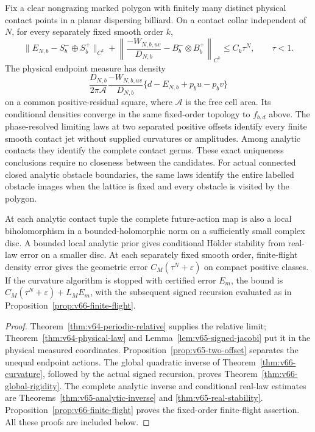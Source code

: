 \begin{theorem}
\label{thm:v66-main}
Fix a clear nongrazing marked polygon with finitely many distinct physical
contact points in a planar dispersing billiard.  On a contact collar
independent of $N$, for every separately fixed smooth order $k$,
\begin{equation}\label{eq:v67-principal-relative}
 \|E_{N,b}-S_b^-\oplus S_b^+\|_{C^k}
 +\left\|\frac{-W_{N,b,uv}}{D_{N,b}}
                       -B_b^-\otimes B_b^+\right\|_{C^k}
                                      \le C_k\tau^N,\qquad \tau<1.
\end{equation}
The physical endpoint measure has density
\[
 \frac{D_{N,b}}{2\pi\mathcal A}
       \frac{-W_{N,b,uv}}{D_{N,b}}
       \{d-E_{N,b}+p_bu-p_bv\}
\]
on a common positive-residual square, where $\mathcal A$ is the free
cell area.  Its conditional densities converge in the same fixed-order
topology to $f_{b,d}$ above.  The phase-resolved limiting laws at two separated positive offsets identify every finite
smooth contact jet without supplied curvatures or amplitudes.  Among
analytic contacts they identify the complete contact germs.  These exact
uniqueness conclusions require no closeness between the candidates.
For actual connected closed analytic obstacle boundaries, the same laws
identify the entire labelled obstacle images when the lattice is fixed
and every obstacle is visited by the polygon.

At each analytic contact tuple the complete future-action map is also a
local biholomorphism in a bounded-holomorphic norm on a sufficiently small
complex disc.  A bounded local analytic prior gives conditional H\"older
stability from real-law error on a smaller disc.  At each separately fixed
smooth order, finite-flight density error gives the geometric error
$C_M(\tau^N+\varepsilon)$ on compact positive classes.  If the
curvature algorithm is stopped with certified error $E_m$, the bound
is $C_M(\tau^N+\varepsilon)+L_ME_m$, with the subsequent signed
recursion evaluated as in Proposition~\ref{prop:v66-finite-flight}.
\end{theorem}
\begin{proof}
Theorem~\ref{thm:v64-periodic-relative} supplies the relative limit;
Theorem~\ref{thm:v64-physical-law} and
Lemma~\ref{lem:v65-signed-jacobi} put it in the physical measured
coordinates.  Proposition~\ref{prop:v65-two-offset} separates the
unequal endpoint actions.  The global quadratic inverse of
Theorem~\ref{thm:v66-curvature}, followed by the actual signed recursion,
proves Theorem~\ref{thm:v66-global-rigidity}.  The complete analytic
inverse and conditional real-law estimates are
Theorems~\ref{thm:v65-analytic-inverse} and
\ref{thm:v65-real-stability}.  Proposition~\ref{prop:v66-finite-flight}
proves the fixed-order finite-flight assertion.  All these proofs are
included below.
\end{proof}

